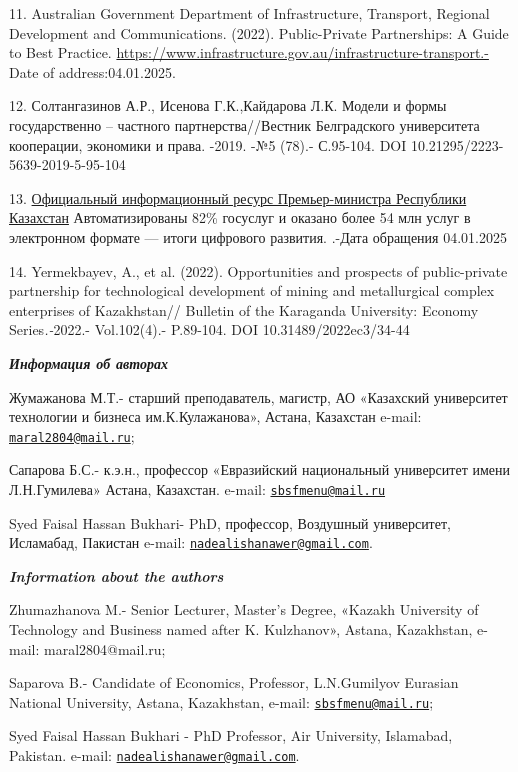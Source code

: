 11. Australian Government Department of Infrastructure, Transport,
Regional Development and Communications. (2022). Public-Private
Partnerships: A Guide to Best Practice.
\url{https://www.infrastructure.gov.au/infrastructure-transport.-} Date
of address:04.01.2025.

12. Солтангазинов А.Р., Исенова Г.К.,Кайдарова Л.К. Модели и формы
государственно -- частного партнерства//Вестник Белградского
университета кооперации, экономики и права. -2019. -№5 (78).- С.95-104.
DOI 10.21295/2223-5639-2019-5-95-104

13. \href{https://primeminister.kz/ru}{Официальный информационный ресурс
Премьер-министра Республики Казахстан} Автоматизированы 82\% госуслуг и
оказано более 54 млн услуг в электронном формате --- итоги цифрового
развития.
\href{https://primeminister.kz/ru/news}{}.-Дата
обращения 04.01.2025

14. Yermekbayev, A., et al. (2022). Opportunities and prospects of
public-private partnership for technological development of mining and
metallurgical complex enterprises of Kazakhstan// Bulletin of the
Karaganda University: Economy Series\emph{.-}2022.- Vol.102(4).-
P.89-104. DOI 10.31489/2022ec3/34-44

\emph{{\bfseries Информация об авторах}}

Жумажанова М.Т.- старший преподаватель, магистр, АО «Казахский
университет технологии и бизнеса им.К.Кулажанова», Астана, Казахстан
e-mail: \href{mailto:maral2804@mail.ru}{\nolinkurl{maral2804@mail.ru}};

Сапарова Б.С.- к.э.н., профессор «Евразийский национальный университет
имени Л.Н.Гумилева» Астана, Казахстан. e-mail:
\href{mailto:sbsfmenu@mail.ru}{\nolinkurl{sbsfmenu@mail.ru}}

Syed Faisal Hassan Bukhari- PhD, профессор, Воздушный университет,
Исламабад, Пакистан e-mail:
\href{mailto:nadealishanawer@gmail.com}{\nolinkurl{nadealishanawer@gmail.com}}.

\emph{{\bfseries Information about the authors}}

Zhumazhanova M.- Senior Lecturer, Master's Degree, «Kazakh University of
Technology and Business named after K. Kulzhanov», Astana, Kazakhstan,
e-mail: maral2804@mail.ru;

Saparova B.- Candidate of Economics, Professor, L.N.Gumilyov Eurasian
National University, Astana, Kazakhstan, e-mail:
\href{mailto:sbsfmenu@mail.ru}{\nolinkurl{sbsfmenu@mail.ru}};

Syed Faisal Hassan Bukhari - PhD Professor, Air University, Islamabad,
Pakistan. e-mail:
\href{mailto:nadealishanawer@gmail.com}{\nolinkurl{nadealishanawer@gmail.com}}.
